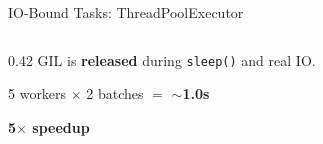 \documentclass[aspectratio=169]{beamer}
\begin{document}
\begin{frame}[fragile]{IO-Bound Tasks: ThreadPoolExecutor}
\begin{columns}
\begin{column}{0.42\textwidth}
            \vspace{0.3em}
            GIL is \textbf{released} during \texttt{sleep()} and real IO.

            \vspace{0.3em}
            5 workers $\times$ 2 batches $=$ \textbf{$\sim$1.0s}

            \vspace{0.5em}
            \colorbox{classA!15}{\parbox{0.85\textwidth}{\centering
                \textbf{5$\times$ speedup}
            }}
        \end{column}
    \end{columns}
\end{frame}

\end{document}
